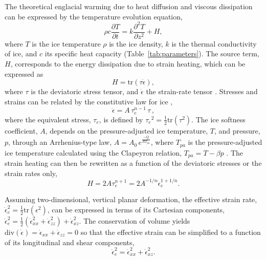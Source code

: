 \documentclass[utf8]{article}
\begin{document}
    The theoretical englacial warming due to heat diffusion and viscous
    dissipation can be expressed by the temperature evolution equation,
    \begin{equation}
      \rho c \frac{\partial T}{\partial t}
        = k \frac{\partial^2 T}{\partial z^2} + H,
    \end{equation}
    where $T$ is the ice temperature $\rho$ is the ice density, $k$ is the
    thermal conductivity of ice, and $c$ its specific heat capacity
    (Table~\ref{tab:parameters}). The source term, $H$, corresponds to the
    energy dissipation due to strain heating, which can be expressed as
    \begin{equation}
      H = \mathrm{tr}(\tau\dot\epsilon),
    \end{equation}
    where $\tau$ is the deviatoric stress tensor, and $\dot\epsilon$ the
    strain-rate tensor \citep[p.~417]{Clarke.etal.1977, Cuffey.Paterson.2010}.
    Stresses and strains can be related by the constitutive law for ice
    \citep{Glen.1952, Nye.1953},
    \begin{equation}
        \dot{\epsilon} = A\,\tau_e^{n-1}\,\tau \,,
    \end{equation}
    where the equivalent stress, $\tau_e$, is defined by ${\tau_e}^2 =
    \frac{1}{2} \mathrm{tr}(\tau^2)$. The ice softness coefficient, $A$,
    depends on the pressure-adjusted ice temperature, $T$, and pressure, $p$,
    through an Arrhenius-type law, $A = A_0 \,e^\frac{-Q}{RT_{pa}}$, where
    $T_{pa}$ is the pressure-adjusted ice temperature calculated using
    the Clapeyron relation, ${T_{pa} = T - \beta p}$
    \citep[p.~72]{Cuffey.Paterson.2010}.
    The strain heating can then be rewritten as a function of the deviatoric
    stresses or the strain rates only,
    \begin{equation}
        H = 2 A \tau_e^{n+1} = 2 A^{-1/n} \dot\epsilon_e^{1+1/n}.
    \end{equation}

    Assuming two-dimensional, vertical planar deformation, the effective strain
    rate, $\dot\epsilon_e^2 = \frac{1}{2}\mathrm{tr}(\epsilon^2)$, can be
    expressed in terms of its Cartesian components, $\dot\epsilon_e^2 =
    \frac{1}{2}(\dot\epsilon_{xx}^2 + \dot\epsilon_{zz}^2) +
    \dot\epsilon_{xz}^2$. The conservation of volume yields
    $\mathrm{div}(\dot\epsilon) = \dot\epsilon_{xx} + \dot\epsilon_{zz} = 0$ so
    that the effective strain can be simplified to a function of its
    longitudinal and shear components,
    \begin{equation}
        \dot\epsilon_e^2 = \dot\epsilon_{xx}^2 + \dot\epsilon_{xz}^2.
    \end{equation}
\end{document}
